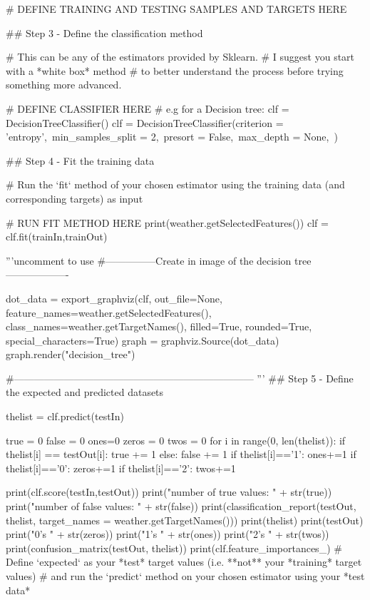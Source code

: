 \documentclass[12pt]{article}
\begin{document}
\begin{python}
# DEFINE TRAINING AND TESTING SAMPLES AND TARGETS HERE

## Step 3 - Define the classification method

# This can be any of the estimators provided by Sklearn.
# I suggest you start with a *white box* method
# to better understand the process before trying something more advanced.

# DEFINE CLASSIFIER HERE
# e.g for a Decision tree: clf = DecisionTreeClassifier()
clf = DecisionTreeClassifier(criterion = 'entropy',\
                            min_samples_split = 2,\
                            presort = False,\
                            max_depth = None,\
                            )


## Step 4 - Fit the training data

# Run the `fit` method of your chosen estimator using the training data (and corresponding targets) as input

# RUN FIT METHOD HERE
print(weather.getSelectedFeatures())
clf = clf.fit(trainIn,trainOut)

'''uncomment to use
#---------------Create in image of the decision tree-------------------

dot_data = export_graphviz(clf, out_file=None, feature_names=weather.getSelectedFeatures(), class_names=weather.getTargetNames(), filled=True, rounded=True, special_characters=True)
graph = graphviz.Source(dot_data)
graph.render("decision_tree")

#------------------------------------------------------------------------
'''
## Step 5 - Define the expected and predicted datasets


thelist = clf.predict(testIn)




true = 0
false = 0
ones=0
zeros = 0
twos = 0
for i in range(0, len(thelist)):
    if thelist[i] == testOut[i]:
        true += 1
    else:
        false += 1
    if thelist[i]=='1':
        ones+=1
    if thelist[i]=='0':
        zeros+=1
    if thelist[i]=='2':
        twos+=1


print(clf.score(testIn,testOut))
print("number of true values: " + str(true))
print("number of false values: " + str(false))
print(classification_report(testOut, thelist, target_names = weather.getTargetNames()))
print(thelist)
print(testOut)
print("0's " + str(zeros))
print("1's " + str(ones))
print("2's " + str(twos))
print(confusion_matrix(testOut, thelist))
print(clf.feature_importances_)
# Define `expected` as your *test* target values (i.e. **not** your *training* target values)
# and run the `predict` method on your chosen estimator using your *test data*


\end{python}
\end{document}
